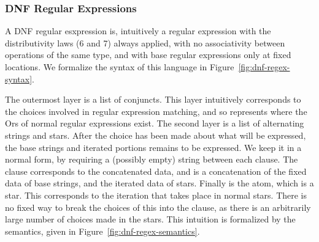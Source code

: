 \subsubsection{DNF Regular Expressions}


A DNF regular esxpression is, intuitively
a regular expression with the distributivity laws (6 and 7) always
applied, with no associativity between operations of the same type,
and with base regular expressions only at fixed locations.
We formalize the syntax of this language in Figure~\ref{fig:dnf-regex-syntax}.

The outermost layer is a list of conjuncts.
This layer intuitively corresponds to the choices involved in regular expression matching, and so represents where the Ors of normal regular expressions exist.
The second layer is a list of alternating strings and stars.
After the choice has been made about what will be expressed,
the base strings and iterated portions remains to be expressed.
We keep it in a normal form, by requiring a (possibly empty) string between
each clause.
The clause corresponds to the concatenated data, and is a concatenation of the
fixed data of base strings, and the iterated data of stars.
Finally is the atom, which is a star.
This corresponds to the iteration that takes place in normal stars.
There is no fixed way to break the choices of this into the clause,
as there is an arbitrarily large number of choices made in the stars.
This intuition is formalized by the semantics, given in Figure~\ref{fig:dnf-regex-semantics}.

